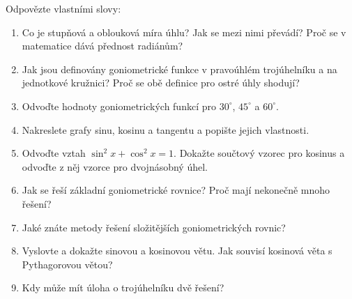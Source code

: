 \begin{problem}
  Odpovězte vlastními slovy:
  \begin{enumerate}
    \item Co je stupňová a oblouková míra úhlu? Jak se mezi nimi převádí? Proč se v matematice dává přednost radiánům?
    \item Jak jsou definovány goniometrické funkce v pravoúhlém trojúhelníku a na jednotkové kružnici? Proč se obě definice pro ostré úhly shodují?
    \item Odvoďte hodnoty goniometrických funkcí pro $30^\circ$, $45^\circ$ a $60^\circ$.
    \item Nakreslete grafy sinu, kosinu a tangentu a popište jejich vlastnosti.
    \item Odvoďte vztah $\sin^2 x + \cos^2 x = 1$. Dokažte součtový vzorec pro kosinus a odvoďte z něj vzorce pro dvojnásobný úhel.
    \item Jak se řeší základní goniometrické rovnice? Proč mají nekonečně mnoho řešení?
    \item Jaké znáte metody řešení složitějších goniometrických rovnic?
    \item Vyslovte a dokažte sinovou a kosinovou větu. Jak souvisí kosinová věta s Pythagorovou větou?
    \item Kdy může mít úloha o trojúhelníku dvě řešení?
  \end{enumerate}
\end{problem}
